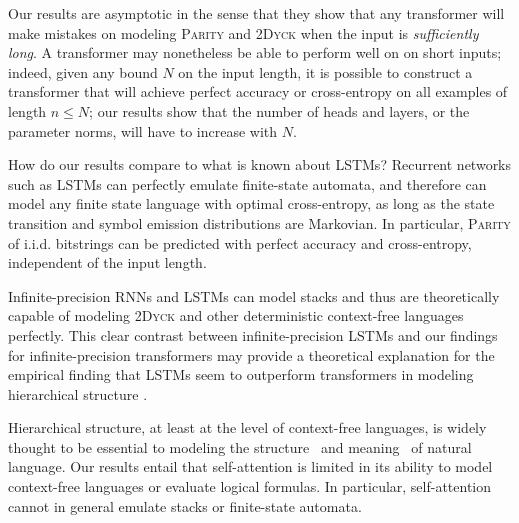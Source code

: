 \documentclass[11pt,a4paper]{article}
\begin{document}
Our results are asymptotic in the sense that they show that any transformer will make mistakes on modeling \textsc{Parity} and \textsc{2Dyck} when the input is \emph{sufficiently long}.
A transformer may nonetheless be able to perform well on on short inputs; indeed, given any bound $N$ on the input length, it is possible to construct a transformer that will achieve perfect accuracy or cross-entropy on all examples of length $n \leq N$; our results show that the number of heads and layers, or the parameter norms, will have to increase with $N$.


How do our results compare to what is known about LSTMs?
Recurrent networks such as LSTMs can perfectly emulate finite-state automata, and therefore can model any finite state language with optimal cross-entropy, as long as the state transition and symbol emission distributions are Markovian.
In particular, \textsc{Parity} of i.i.d. bitstrings can be predicted with perfect accuracy and cross-entropy, independent of the input length.

Infinite-precision RNNs and LSTMs can model stacks \cite{tabor2000fractal,gruning2006stack,kirov2012processing} and thus are theoretically capable of modeling \textsc{2Dyck} and other deterministic context-free languages perfectly. %
This clear contrast between infinite-precision LSTMs and our findings for infinite-precision transformers may provide a theoretical explanation for the empirical finding that LSTMs seem to outperform transformers in modeling hierarchical structure \citep{tran2018importance}.


Hierarchical structure, at least at the level of context-free languages, is widely thought to be essential to modeling the structure~\cite{everaert2015structures} and meaning~\cite{montague1973proper} of natural language.
Our results entail that self-attention is limited in its ability to model context-free languages or evaluate logical formulas.
In particular, self-attention cannot in general emulate stacks or finite-state automata.
\end{document}
